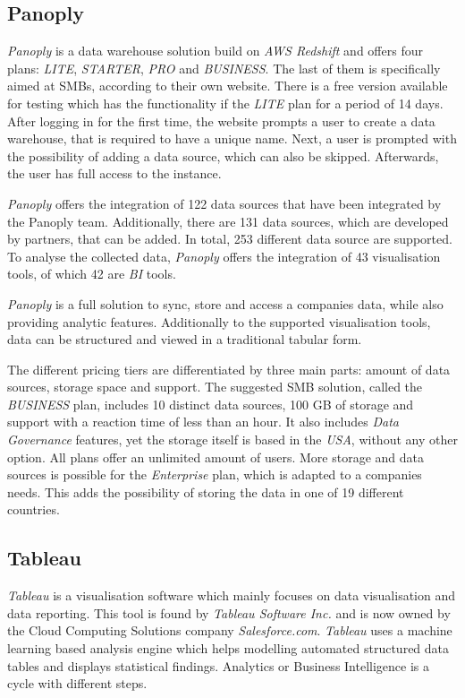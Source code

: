\documentclass[../paper.tex]{subfiles}
\begin{document}
\subsection{Panoply}

\textit{Panoply} is a data warehouse solution build on \textit{AWS Redshift} and offers four plans: \textit{LITE}, \textit{STARTER}, \textit{PRO} and \textit{BUSINESS}. The last of them is specifically aimed at SMBs, according to their own website. There is a free version available for testing which has the functionality if the \textit{LITE} plan for a period of 14 days. After logging in for the first time, the website prompts a user to create a data warehouse, that is required to have a unique name. Next, a user is prompted with the possibility of adding a data source, which can also be skipped. Afterwards, the user has full access to the instance.

\textit{Panoply} offers the integration of 122 data sources that have been integrated by the Panoply team. Additionally, there are 131 data sources, which are developed by partners, that can be added. In total, 253 different data source are supported. To analyse the collected data, \textit{Panoply} offers the integration of 43 visualisation tools, of which 42 are \textit{BI} tools.

\textit{Panoply} is a full solution to sync, store and access a companies data, while also providing analytic features. Additionally to the supported visualisation tools, data can be structured and viewed in a traditional tabular form.

The different pricing tiers are differentiated by three main parts: amount of data sources, storage space and support. The suggested SMB solution, called the \textit{BUSINESS} plan, includes 10 distinct data sources, 100 GB of storage and support with a reaction time of less than an hour. It also includes \textit{Data Governance} features, yet the storage itself is based in the \textit{USA}, without any other option. All plans offer an unlimited amount of users. More storage and data sources is possible for the \textit{Enterprise} plan, which is adapted to a companies needs. This adds the possibility of storing the data in one of 19 different countries.

\subsection{Tableau}

\textit{Tableau} is a visualisation software which mainly focuses on data visualisation and data reporting. This tool is found by \textit{Tableau Software  Inc.} and is now owned by the Cloud Computing Solutions company \textit{Salesforce.com}. \textit{Tableau} uses a machine learning based analysis engine which helps modelling  automated structured data tables and displays statistical findings. Analytics or Business Intelligence is a cycle with different steps. 
\end{document}
